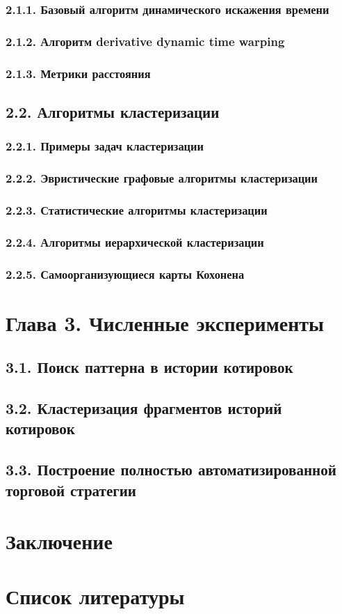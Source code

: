 \documentclass[12pt]{article}
\begin{document}
\subsubsection{2.1.1. Базовый алгоритм динамического искажения времени}
\subsubsection{2.1.2. Алгоритм derivative dynamic time warping}
\subsubsection{2.1.3. Метрики расстояния}
\newpage{}
\subsection{2.2. Алгоритмы кластеризации}
\subsubsection{2.2.1. Примеры задач кластеризации}
\subsubsection{2.2.2. Эвристические графовые алгоритмы кластеризации}
\subsubsection{2.2.3. Статистические алгоритмы кластеризации}
\subsubsection{2.2.4. Алгоритмы иерархической кластеризации}
\subsubsection{2.2.5. Самоорганизующиеся карты Кохонена}
\section{Глава 3. Численные эксперименты}
\subsection{3.1. Поиск паттерна в истории котировок}
\subsection{3.2. Кластеризация фрагментов историй котировок}
\subsection{3.3. Построение полностью автоматизированной торговой стратегии}
\section{Заключение}
\section{Список литературы}
\end{document}
